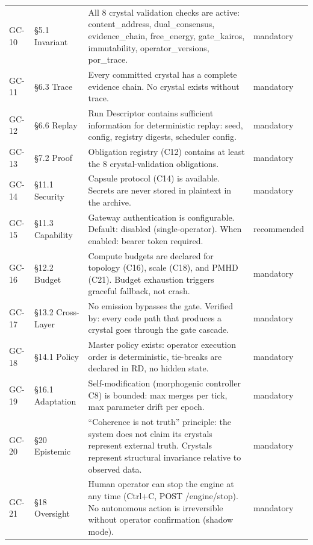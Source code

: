 \documentclass[11pt,a4paper,twoside]{article}
\theoremstyle{definition}
\theoremstyle{plain}
\theoremstyle{remark}
\begin{document}
\begin{longtable}{l l p{5.5cm} l}
GC-10 & \S5.1 Invariant & All 8 crystal validation checks are
  active: content\_address, dual\_consensus, evidence\_chain,
  free\_energy, gate\_kairos, immutability, operator\_versions,
  por\_trace. & mandatory \\

GC-11 & \S6.3 Trace & Every committed crystal has a complete
  evidence chain. No crystal exists without trace. & mandatory \\

GC-12 & \S6.6 Replay & Run Descriptor contains sufficient
  information for deterministic replay: seed, config, registry
  digests, scheduler config. & mandatory \\

GC-13 & \S7.2 Proof & Obligation registry (C12) contains at least
  the 8 crystal-validation obligations. & mandatory \\

GC-14 & \S11.1 Security & Capsule protocol (C14) is available.
  Secrets are never stored in plaintext in the archive. &
  mandatory \\

GC-15 & \S11.3 Capability & Gateway authentication is configurable.
  Default: disabled (single-operator). When enabled: bearer token
  required. & recommended \\

GC-16 & \S12.2 Budget & Compute budgets are declared for topology
  (C16), scale (C18), and PMHD (C21). Budget exhaustion triggers
  graceful fallback, not crash. & mandatory \\

GC-17 & \S13.2 Cross-Layer & No emission bypasses the gate. Verified
  by: every code path that produces a crystal goes through the
  gate cascade. & mandatory \\

GC-18 & \S14.1 Policy & Master policy exists: operator execution
  order is deterministic, tie-breaks are declared in RD, no hidden
  state. & mandatory \\

GC-19 & \S16.1 Adaptation & Self-modification (morphogenic
  controller C8) is bounded: max merges per tick, max parameter
  drift per epoch. & mandatory \\

GC-20 & \S20 Epistemic & ``Coherence is not truth'' principle:
  the system does not claim its crystals represent external truth.
  Crystals represent structural invariance relative to observed
  data. & mandatory \\

GC-21 & \S18 Oversight & Human operator can stop the engine at any
  time (Ctrl+C, POST /engine/stop). No autonomous action is
  irreversible without operator confirmation (shadow mode). &
  mandatory \\

\end{longtable}
\end{document}
